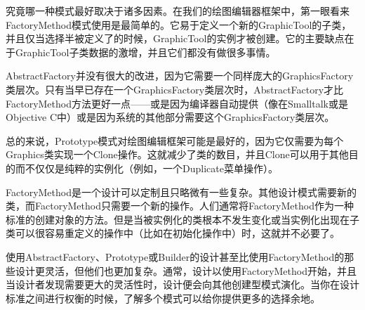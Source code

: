 
究竟哪一种模式最好取决于诸多因素。在我们的绘图编辑器框架中，第一眼看来FactoryMethod模式使用是最简单的。它易于定义一个新的GraphicTool的子类，并且仅当选择半被定义了的时候，GraphicTool的实例才被创建。它的主要缺点在于GraphicTool子类数据的激增，并且它们都没有做很多事情。

AbstractFactory并没有很大的改进，因为它需要一个同样庞大的GraphicsFactory类层次。只有当早已存在一个GraphicsFactory类层次时，AbstractFactory才比FactoryMethod方法更好一点——或是因为编译器自动提供（像在Smalltalk或是Objective C中）或是因为系统的其他部分需要这个GraphicsFactory类层次。

总的来说，Prototype模式对绘图编辑框架可能是最好的，因为它仅需要为每个Graphics类实现一个Clone操作。这就减少了类的数目，并且Clone可以用于其他目的而不仅仅是纯粹的实例化（例如，一个Duplicate菜单操作）。

FactoryMethod是一个设计可以定制且只略微有一些复杂。其他设计模式需要新的类，而FactoryMethod只需要一个新的操作。人们通常将FactoryMethod作为一种标准的创建对象的方法。但是当被实例化的类根本不发生变化或当实例化出现在子类可以很容易重定义的操作中（比如在初始化操作中）时，这就并不必要了。

使用AbstractFactory、Prototype或Builder的设计甚至比使用FactoryMethod的那些设计更灵活，但他们也更加复杂。通常，设计以使用FactoryMethod开始，并且当设计者发现需要更大的灵活性时，设计便会向其他创建型模式演化。当你在设计标准之间进行权衡的时候，了解多个模式可以给你提供更多的选择余地。


